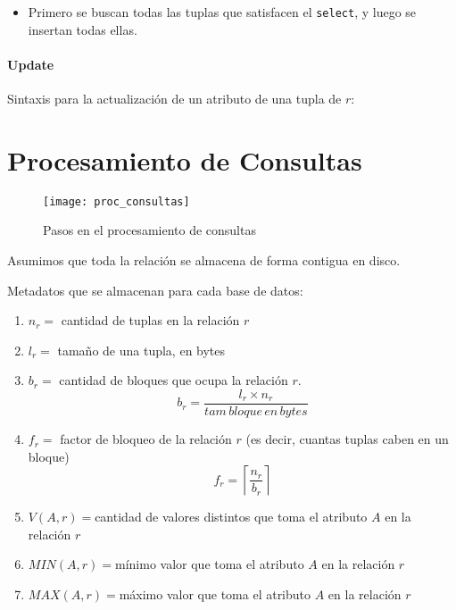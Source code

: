 \documentclass[a4paper, twoside]{article}
\newcommand{\codedir}{../resources/code} %
\begin{document}




\begin{itemize}
\item Primero se buscan todas las tuplas que satisfacen el \texttt{select}, y luego se insertan todas ellas.
\end{itemize}

\subsection{Update}
Sintaxis para la actualización de un atributo de una tupla de $r$:





\newpage
\part{Procesamiento de Consultas}
\begin{figure}[H]
	\centering
	\texttt{[image: proc\_consultas]}
	\caption{Pasos en el procesamiento de consultas}
\end{figure}

Asumimos que toda la relación se almacena de forma contigua en disco.

Metadatos que se almacenan para cada base de datos:
\begin{enumerate}
	\item $n_{r}=$ cantidad de tuplas en la relación $r$
	\item $l_{r}=$ tamaño de una tupla, en bytes
	\item $b_{r}=$ cantidad de bloques que ocupa la relación $r$. 
	\[
		b_{r}=\frac{l_{r}\times n_{r}}{tam\, bloque\, en\, bytes}
	\]
	\item $f_{r}=$ factor de bloqueo de la relación $r$ (es decir, cuantas tuplas caben en un bloque)
	\[
		f_{r}=\left\lceil \frac{n_{r}}{b_{r}}\right\rceil 
	\]
	\item $V(A,r)=$cantidad de valores distintos que toma el atributo $A$ en la relación $r$
	\item $MIN(A,r)=$mínimo valor que toma el atributo $A$ en la relación $r$
	\item $MAX(A,r)=$máximo valor que toma el atributo $A$ en la relación $r$
\end{enumerate}
\end{document}
